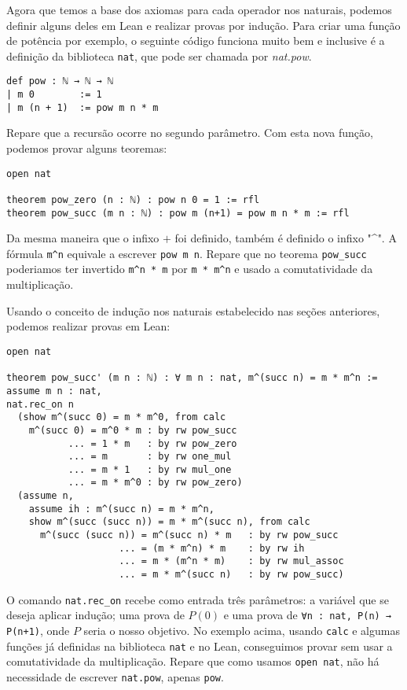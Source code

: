 Agora que temos a base dos axiomas para cada operador nos naturais, podemos definir alguns deles em Lean e realizar provas por indução. Para criar uma função de potência por exemplo, o seguinte código funciona muito bem e inclusive é a definição da biblioteca \lstinline{nat}, que pode ser chamada por \textit{nat.pow}.

\begin{lstlisting}
def pow : ℕ → ℕ → ℕ
| m 0        := 1
| m (n + 1)  := pow m n * m
\end{lstlisting}

Repare que a recursão ocorre no segundo parâmetro. Com esta nova função, podemos provar alguns teoremas:

\begin{lstlisting}
open nat

theorem pow_zero (n : ℕ) : pow n 0 = 1 := rfl
theorem pow_succ (m n : ℕ) : pow m (n+1) = pow m n * m := rfl
\end{lstlisting}

Da mesma maneira que o infixo $+$ foi definido, também é definido o infixo "\textasciicircum ". A fórmula \lstinline{m^n} equivale a escrever \lstinline{pow m n}. Repare que no teorema \lstinline{pow_succ} poderiamos ter invertido \lstinline{m^n * m} por \lstinline{m * m^n} e usado a comutatividade da multiplicação.

Usando o conceito de indução nos naturais estabelecido nas seções anteriores, podemos realizar provas em Lean:

\begin{lstlisting}
open nat

theorem pow_succ' (m n : ℕ) : ∀ m n : nat, m^(succ n) = m * m^n :=
assume m n : nat,
nat.rec_on n 
  (show m^(succ 0) = m * m^0, from calc
    m^(succ 0) = m^0 * m : by rw pow_succ
           ... = 1 * m   : by rw pow_zero
           ... = m       : by rw one_mul
           ... = m * 1   : by rw mul_one
           ... = m * m^0 : by rw pow_zero)
  (assume n,
    assume ih : m^(succ n) = m * m^n,
    show m^(succ (succ n)) = m * m^(succ n), from calc
      m^(succ (succ n)) = m^(succ n) * m   : by rw pow_succ
                    ... = (m * m^n) * m    : by rw ih
                    ... = m * (m^n * m)    : by rw mul_assoc
                    ... = m * m^(succ n)   : by rw pow_succ)
\end{lstlisting}

O comando \lstinline{nat.rec_on} recebe como entrada três parâmetros: a variável que se deseja aplicar indução; uma prova de $P(0)$ e uma prova de \lstinline{∀n : nat, P(n) → P(n+1)}, onde $P$ seria o nosso objetivo. No exemplo acima, usando \lstinline{calc} e algumas funções já definidas na biblioteca \lstinline{nat} e no Lean, conseguimos provar sem usar a comutatividade da multiplicação. Repare que como usamos \lstinline{open nat}, não há necessidade de escrever \lstinline{nat.pow}, apenas \lstinline{pow}.

